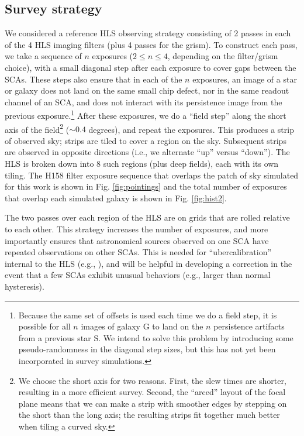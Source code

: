 \documentclass[usenatbib]{mnras}
\begin{document}
\subsection{Survey strategy}

We considered a reference HLS observing strategy consisting of 2 passes in each of the 4 HLS imaging filters (plus 4 passes for the grism). To construct each pass, we take a sequence of $n$ exposures ($2\le n\le 4$, depending on the filter/grism choice), with a small diagonal step after each exposure to cover gaps between the SCAs. These steps also ensure that in each of the $n$ exposures, an image of a star or galaxy does not land on the same small chip defect, nor in the same readout channel of an SCA, and does not interact with its persistence image from the previous exposure.\footnote{Because the same set of offsets is used each time we do a field step, it is possible for all $n$ images of galaxy G to land on the $n$ persistence artifacts from a previous star S. We intend to solve this problem by introducing some pseudo-randomness in the diagonal step sizes, but this has not yet been incorporated in survey simulations.} After these exposures, we do a ``field step'' along the short axis of the field\footnote{We choose the short axis for two reasons. First, the slew times are shorter, resulting in a more efficient survey. Second, the ``arced'' layout of the focal plane means that we can make a strip with smoother edges by stepping on the short than the long axis; the resulting strips fit together much better when tiling a curved sky.} ($\sim 0.4$ degrees), and repeat the exposures. This produces a strip of observed sky; strips are tiled to cover a region on the sky. Subsequent strips are observed in opposite directions (i.e., we alternate ``up'' versus ``down''). The HLS is broken down into 8 such regions (plus deep fields), each with its own tiling. The H158 filter exposure sequence that overlaps the patch of sky simulated for this work is shown in Fig. \ref{fig:pointings} and the total number of exposures that overlap each simulated galaxy is shown in Fig. \ref{fig:hist2}.

The two passes over each region of the HLS are on grids that are rolled relative to each other. This strategy increases the number of exposures, and more importantly ensures that astronomical sources observed on one SCA have repeated observations on other SCAs. This is needed for ``ubercalibration'' internal to the HLS (e.g., \citealt{2008ApJ...674.1217P}), and will be helpful in developing a correction in the event that a few SCAs exhibit unusual behaviors (e.g., larger than normal hysteresis).
\end{document}
